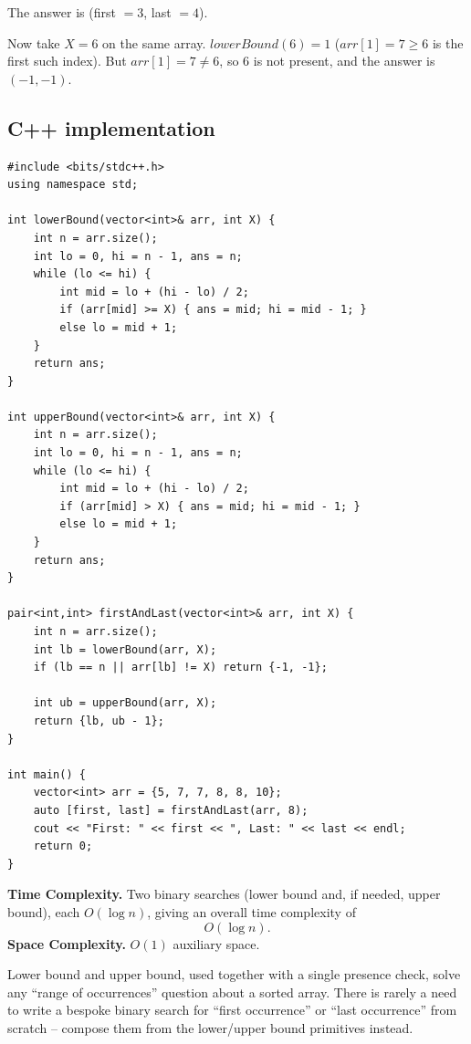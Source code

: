 The answer is (first $=3$, last $=4$).

Now take $X = 6$ on the same array. $\textit{lowerBound}(6) = 1$
($\textit{arr}[1]=7 \ge 6$ is the first such index). But
$\textit{arr}[1] = 7 \ne 6$, so $6$ is not present, and the answer is
$(-1, -1)$.

\subsection*{C++ implementation}

\begin{lstlisting}
#include <bits/stdc++.h>
using namespace std;

int lowerBound(vector<int>& arr, int X) {
    int n = arr.size();
    int lo = 0, hi = n - 1, ans = n;
    while (lo <= hi) {
        int mid = lo + (hi - lo) / 2;
        if (arr[mid] >= X) { ans = mid; hi = mid - 1; }
        else lo = mid + 1;
    }
    return ans;
}

int upperBound(vector<int>& arr, int X) {
    int n = arr.size();
    int lo = 0, hi = n - 1, ans = n;
    while (lo <= hi) {
        int mid = lo + (hi - lo) / 2;
        if (arr[mid] > X) { ans = mid; hi = mid - 1; }
        else lo = mid + 1;
    }
    return ans;
}

pair<int,int> firstAndLast(vector<int>& arr, int X) {
    int n = arr.size();
    int lb = lowerBound(arr, X);
    if (lb == n || arr[lb] != X) return {-1, -1};

    int ub = upperBound(arr, X);
    return {lb, ub - 1};
}

int main() {
    vector<int> arr = {5, 7, 7, 8, 8, 10};
    auto [first, last] = firstAndLast(arr, 8);
    cout << "First: " << first << ", Last: " << last << endl;
    return 0;
}
\end{lstlisting}

\begin{complexitybox}
\textbf{Time Complexity.} Two binary searches (lower bound and, if needed,
upper bound), each $O(\log n)$, giving an overall time complexity of
\[
  O(\log n).
\]
\textbf{Space Complexity.} $O(1)$ auxiliary space.
\end{complexitybox}

\begin{takeawaybox}
Lower bound and upper bound, used together with a single presence check,
solve any ``range of occurrences'' question about a sorted array. There is
rarely a need to write a bespoke binary search for ``first occurrence'' or
``last occurrence'' from scratch -- compose them from the lower/upper bound
primitives instead.
\end{takeawaybox}
